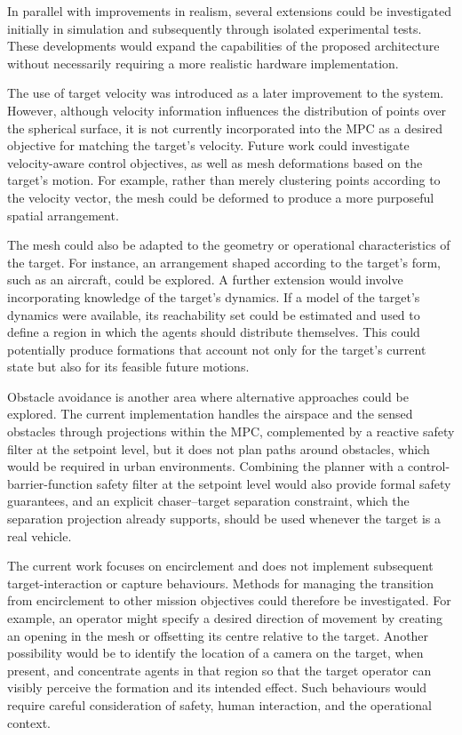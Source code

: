 In parallel with improvements in realism, several extensions could be investigated initially in simulation and subsequently through isolated experimental tests. These developments would expand the capabilities of the proposed architecture without necessarily requiring a more realistic hardware implementation.

The use of target velocity was introduced as a later improvement to the system. However, although velocity information influences the distribution of points over the spherical surface, it is not currently incorporated into the \gls{MPC} as a desired objective for matching the target's velocity. Future work could investigate velocity-aware control objectives, as well as mesh deformations based on the target's motion. For example, rather than merely clustering points according to the velocity vector, the mesh could be deformed to produce a more purposeful spatial arrangement.

The mesh could also be adapted to the geometry or operational characteristics of the target. For instance, an arrangement shaped according to the target's form, such as an aircraft, could be explored. A further extension would involve incorporating knowledge of the target's dynamics. If a model of the target's dynamics were available, its reachability set could be estimated and used to define a region in which the agents should distribute themselves. This could potentially produce formations that account not only for the target's current state but also for its feasible future motions.

Obstacle avoidance is another area where alternative approaches could be explored. The current implementation handles the airspace and the sensed obstacles through projections within the \gls{MPC}, complemented by a reactive safety filter at the setpoint level, but it does not plan paths around obstacles, which would be required in urban environments. Combining the planner with a control-barrier-function safety filter at the setpoint level would also provide formal safety guarantees, and an explicit chaser--target separation constraint, which the separation projection already supports, should be used whenever the target is a real vehicle.

The current work focuses on encirclement and does not implement subsequent target-interaction or capture behaviours. Methods for managing the transition from encirclement to other mission objectives could therefore be investigated. For example, an operator might specify a desired direction of movement by creating an opening in the mesh or offsetting its centre relative to the target. Another possibility would be to identify the location of a camera on the target, when present, and concentrate agents in that region so that the target operator can visibly perceive the formation and its intended effect. Such behaviours would require careful consideration of safety, human interaction, and the operational context.

